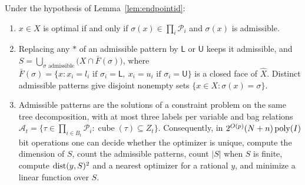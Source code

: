 \begin{corollary}\label{cor:facecsp}
Under the hypothesis of Lemma~\ref{lem:endpointid}:
\begin{enumerate}
\item[(i)] $x\in X$ is optimal if and only if $\sigma(x)\in\prod_i\mathcal P_i$
and $\sigma(x)$ is admissible.
\item[(ii)] Replacing any $\ast$ of an admissible pattern by $\mathsf L$ or
$\mathsf U$ keeps it admissible, and
$S=\bigcup_{\sigma\text{ admissible}}\bigl(X\cap\bar F(\sigma)\bigr)$, where
$\bar F(\sigma)=\{x:x_i=l_i\text{ if }\sigma_i=\mathsf L,\ x_i=u_i\text{ if }
\sigma_i=\mathsf U\}$ is a closed face of $\hat X$. Distinct admissible
patterns give disjoint nonempty sets $\{x\in X:\sigma(x)=\sigma\}$.
\item[(iii)] Admissible patterns are the solutions of a constraint problem on
the same tree decomposition, with at most three labels per variable and bag
relations
$\mathcal A_t=\{\tau\in\prod_{i\in B_t}\mathcal P_i:\operatorname{cube}(\tau)
\subseteq Z_t\}$. Consequently, in $2^{O(p)}(N+n)\operatorname{poly}(I)$ bit operations
one can decide whether the optimizer is unique, compute the dimension of $S$,
count the admissible patterns, count $|S|$ when $S$ is finite, compute
$\operatorname{dist}(y,S)^2$ and a nearest optimizer for a rational $y$, and minimize a
linear function over $S$.
\end{enumerate}
\end{corollary}

